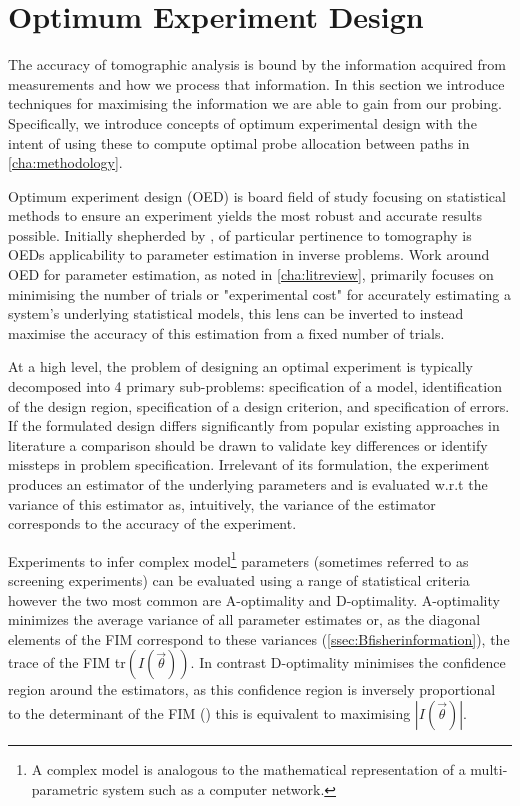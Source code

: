 \section{Optimum Experiment Design}
\label{sec:Boptimization}
The accuracy of tomographic analysis is bound by the information acquired from measurements and how we process that information. In this section we introduce techniques for maximising the information we are able to gain from our probing. Specifically, we introduce concepts of optimum experimental design with the intent of using these to compute optimal probe allocation between paths in \cref{cha:methodology}.\par
Optimum experiment design (OED) is board field of study focusing on statistical methods to ensure an experiment yields the most robust and accurate results possible. Initially shepherded by \cite{smith_standard_1918}, of particular pertinence to tomography is OEDs applicability to parameter estimation in inverse problems. Work around OED for parameter estimation, as noted in \cref{cha:litreview}, primarily focuses on minimising the number of trials or "experimental cost" for accurately estimating a system's underlying statistical models, this lens can be inverted to instead maximise the accuracy of this estimation from a fixed number of trials.\par
At a high level, the problem of designing an optimal experiment is typically decomposed into 4 primary sub-problems: specification of a model, identification of the design region, specification of a design criterion, and specification of errors. If the formulated design differs significantly from popular existing approaches in literature a comparison should be drawn to validate key differences or identify missteps in problem specification. Irrelevant of its formulation, the experiment produces an estimator of the underlying parameters and is evaluated w.r.t the variance of this estimator as, intuitively, the variance of the estimator corresponds to the accuracy of the experiment.\par
Experiments to infer complex model\footnote{A complex model is analogous to the mathematical representation of a multi-parametric system such as a computer network.} parameters (sometimes referred to as screening experiments) can be evaluated using a range of statistical criteria however the two most common are A-optimality and D-optimality. A-optimality minimizes the average variance of all parameter estimates or, as the diagonal elements of the FIM correspond to these variances (\cref{ssec:Bfisherinformation}), the trace of the FIM tr$\left(I(\vec{\theta})\right)$. In contrast D-optimality minimises the confidence region around the estimators, as this confidence region is inversely proportional to the determinant of the FIM (\cite{jones_-optimal_2021}) this is equivalent to maximising $|I(\vec{\theta})|$.\par

